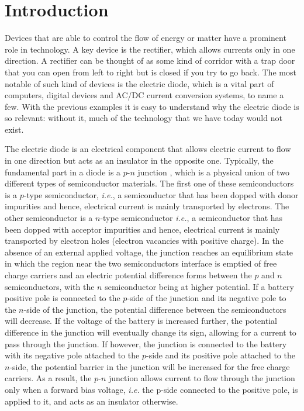 
\chapter*{Introduction} %
\label{Introduction}

Devices that are able to control the flow of energy or matter have a prominent role in technology. A key device is the rectifier, which allows currents only in one direction. A rectifier can be thought of as some kind of corridor with a trap door that you can open from left to right but is closed if you try to go back. The most notable of such kind of devices is the electric diode, which is a vital part of computers, digital devices and AC/DC current conversion systems, to name a few. With the previous examples it is easy to understand why the electric diode is so relevant: without it, much of the technology that we have today would not exist.

The electric diode is an electrical component that allows electric current to flow in one direction but acts as an insulator in the opposite one. Typically, the fundamental part in a diode is a $p$-$n$ junction \cite{Neamen2003}, which is a physical union of two different types of semiconductor materials. The first one of these semiconductors is a $p$-type semiconductor, \textit{i.e.}, a semiconductor that has been dopped with donor impurities and hence, electrical current is mainly transported by electrons. The other semiconductor is a $n$-type semiconductor \textit{i.e.}, a semiconductor that has been dopped with acceptor impurities and hence, electrical current is mainly transported by electron holes (electron vacancies with positive charge). In the absence of an external applied voltage, the junction reaches an equilibrium state in which the region near the two semiconductors interface is emptied of free charge carriers and an electric potential difference forms between the $p$ and $n$ semiconductors, with the $n$ semiconductor being at higher potential. If a battery positive pole is connected to the $p$-side of the junction and its negative pole to the $n$-side of the junction, the potential difference between the semiconductors will decrease. If the voltage of the battery is increased further, the potential difference in the junction will eventually change its sign, allowing for a current to pass through the junction. If however, the junction is connected to the battery with its negative pole attached to the $p$-side and its positive pole attached to the $n$-side, the potential barrier in the junction will be increased for the free charge carriers. As a result, the $p$-$n$ junction allows current to flow through the junction only when a forward bias voltage, \textit{i.e.} the p-side connected to the positive pole, is applied to it, and acts as an insulator otherwise.

